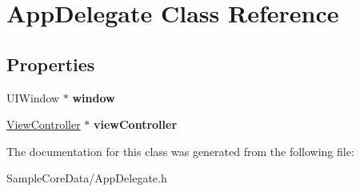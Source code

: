 \hypertarget{interface_app_delegate}{\section{App\-Delegate Class Reference}
\label{interface_app_delegate}
}
\subsection*{Properties}
\begin{DoxyCompactItemize}
\item 
\hypertarget{interface_app_delegate_acf48ac24125e688cac1a85445cd7fac2}{U\-I\-Window $\ast$ {\bfseries window}}\label{interface_app_delegate_acf48ac24125e688cac1a85445cd7fac2}

\item 
\hypertarget{interface_app_delegate_afdae0acffddf96a8e7930b1151734078}{\hyperlink{interface_view_controller}{View\-Controller} $\ast$ {\bfseries view\-Controller}}\label{interface_app_delegate_afdae0acffddf96a8e7930b1151734078}

\end{DoxyCompactItemize}


The documentation for this class was generated from the following file\-:\begin{DoxyCompactItemize}
\item 
Sample\-Core\-Data/App\-Delegate.\-h\end{DoxyCompactItemize}
